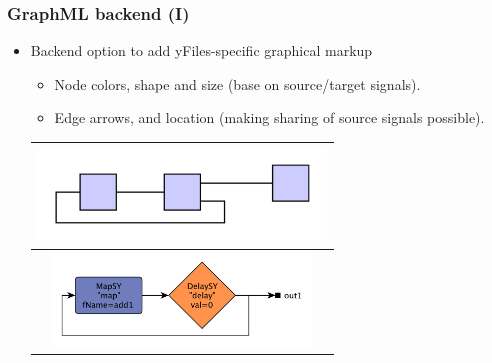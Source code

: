 \documentclass{beamer}
\begin{document}
\beamerdefaultoverlayspecification{}
\begin{frame}
  \frametitle{GraphML backend (I)}
  \begin{itemize}
  \item Backend option to add yFiles-specific graphical markup
    \begin{itemize}
    \item Node colors, shape and size (base on source/target signals).
    \item Edge arrows, and location (making sharing of source signals possible).
    \end{itemize}

    \begin{tabular}{c}
      \includegraphics[height=2.5cm]{figures/counter}\\
      \hline
      \includegraphics[height=2.5cm]{figures/counter_yFiles}\\
    \end{tabular}
  \end{itemize}
  
\end{frame}
\end{document}
